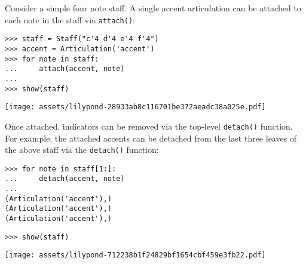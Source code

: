 Consider a simple four note staff. A single accent articulation can be attached
to each note in the staff via \texttt{attach()}:

\begin{comment}
<abjad>
staff = Staff("c'4 d'4 e'4 f'4")
accent = Articulation('accent')
for note in staff:
    attach(accent, note)

show(staff)
</abjad>
\end{comment}

\begin{abjadbookoutput}
\begin{singlespacing}
\vspace{-0.5\baselineskip}
\begin{verbatim}
>>> staff = Staff("c'4 d'4 e'4 f'4")
>>> accent = Articulation('accent')
>>> for note in staff:
...     attach(accent, note)
...
>>> show(staff)
\end{verbatim}
\noindent\texttt{[image: assets/lilypond-28933ab8c116701be372aeadc38a025e.pdf]}
\end{singlespacing}
\end{abjadbookoutput}

\noindent Once attached, indicators can be removed via the top-level
\texttt{detach()} function. For example, the attached accents can be detached
from the last three leaves of the above staff via the \texttt{detach()}
function:

\begin{comment}
<abjad>
for note in staff[1:]:
    detach(accent, note)

show(staff)
</abjad>
\end{comment}

\begin{abjadbookoutput}
\begin{singlespacing}
\vspace{-0.5\baselineskip}
\begin{verbatim}
>>> for note in staff[1:]:
...     detach(accent, note)
...
(Articulation('accent'),)
(Articulation('accent'),)
(Articulation('accent'),)
\end{verbatim}
\begin{verbatim}
>>> show(staff)
\end{verbatim}
\noindent\texttt{[image: assets/lilypond-712238b1f24829bf1654cbf459e3fb22.pdf]}
\end{singlespacing}
\end{abjadbookoutput}


